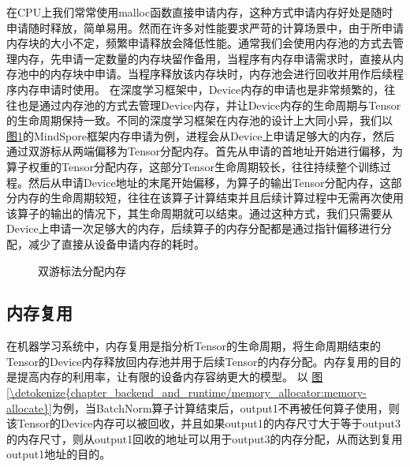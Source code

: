 \documentclass[letterpaper,10pt,english]{sphinxmanual}
\let\sphinxpxdimen\pdfpxdimen\else\newdimen\sphinxpxdimen
\begin{document}
\sphinxAtStartPar
在CPU上我们常常使用malloc函数直接申请内存，这种方式申请内存好处是随时申请随时释放，简单易用。然而在许多对性能要求严苛的计算场景中，由于所申请内存块的大小不定，频繁申请释放会降低性能。通常我们会使用内存池的方式去管理内存，先申请一定数量的内存块留作备用，当程序有内存申请需求时，直接从内存池中的内存块中申请。当程序释放该内存块时，内存池会进行回收并用作后续程序内存申请时使用。
在深度学习框架中，Device内存的申请也是非常频繁的，往往也是通过内存池的方式去管理Device内存，并让Device内存的生命周期与Tensor的生命周期保持一致。不同的深度学习框架在内存池的设计上大同小异，我们以
\hyperref[\detokenize{chapter_backend_and_runtime/memory_allocator:device-malloc}]{图\ref{\detokenize{chapter_backend_and_runtime/memory_allocator:device-malloc}}}的MindSpore框架内存申请为例，进程会从Device上申请足够大的内存，然后通过双游标从两端偏移为Tensor分配内存。首先从申请的首地址开始进行偏移，为算子权重的Tensor分配内存，这部分Tensor生命周期较长，往往持续整个训练过程。然后从申请Device地址的末尾开始偏移，为算子的输出Tensor分配内存，这部分内存的生命周期较短，往往在该算子计算结束并且后续计算过程中无需再次使用该算子的输出的情况下，其生命周期就可以结束。通过这种方式，我们只需要从Device上申请一次足够大的内存，后续算子的内存分配都是通过指针偏移进行分配，减少了直接从设备申请内存的耗时。

\begin{figure}[H]
\centering
\capstart

\noindent\sphinxincludegraphics[width=800\sphinxpxdimen]{{device_malloc}.png}
\caption{双游标法分配内存}\label{\detokenize{chapter_backend_and_runtime/memory_allocator:id9}}\label{\detokenize{chapter_backend_and_runtime/memory_allocator:device-malloc}}\end{figure}


\subsection{内存复用}
\label{\detokenize{chapter_backend_and_runtime/memory_allocator:id4}}
\sphinxAtStartPar
在机器学习系统中，内存复用是指分析Tensor的生命周期，将生命周期结束的Tensor的Device内存释放回内存池并用于后续Tensor的内存分配。内存复用的目的是提高内存的利用率，让有限的设备内存容纳更大的模型。
以
\hyperref[\detokenize{chapter_backend_and_runtime/memory_allocator:memory-allocate}]{图\ref{\detokenize{chapter_backend_and_runtime/memory_allocator:memory-allocate}}}为例，当BatchNorm算子计算结束后，output1不再被任何算子使用，则该Tensor的Device内存可以被回收，并且如果output1的内存尺寸大于等于output3的内存尺寸，则从output1回收的地址可以用于output3的内存分配，从而达到复用output1地址的目的。
\end{document}
